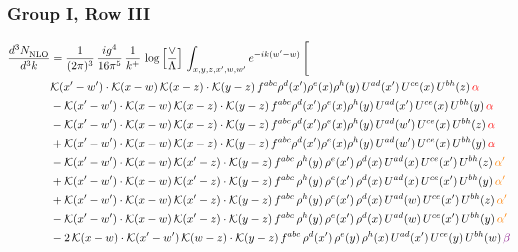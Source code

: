 \documentclass[9pt]{article}
\numberwithin{equation}{section}
\begin{document}
\subsubsection{Group I, Row III}
\begin{align}
    \frac{d^{3}N_{\rm NLO}^{\rm}}{d^{3}k}  & = \frac{1}{(2\pi)^{3}}\, \frac{ig^{4}}{16\pi^{5}}\, \frac{1}{k^{+}}\, \log{\left[\frac{\vee}{\Lambda}\right]}\, \int_{x,y,z,x^{\prime},w,w^{\prime}}e^{-ik(w^{\prime}-w)}\, \Bigg[\notag \\ & \mathcal{K}(x'-w')\cdot \mathcal{K}(x-w)\, \mathcal{K}(x-z)\cdot \mathcal{K}(y-z)\, f^{abc}\rho^{d}(x')\rho^{e}(x)\rho^{h}(y)\, U^{ad}(x')\,U^{ce}(x)\, U^{bh}(z)\,{\color{red} \alpha}\notag\\ & - \mathcal{K}(x'-w')\cdot \mathcal{K}(x-w)\, \mathcal{K}(x-z)\cdot \mathcal{K}(y-z)\, f^{abc}\rho^{d}(x')\rho^{e}(x)\rho^{h}(y)\, U^{ad}(x')\,U^{ce}(x)\, U^{bh}(y)\,{\color{red} \alpha}\notag \\ &-\mathcal{K}(x'-w')\cdot \mathcal{K}(x-w)\, \mathcal{K}(x-z)\cdot \mathcal{K}(y-z)\, f^{abc}\rho^{d}(x')\rho^{e}(x)\rho^{h}(y)\, U^{ad}(w')\,U^{ce}(x)\, U^{bh}(z)\,{\color{red} \alpha}\notag \\ & +\mathcal{K}(x'-w')\cdot \mathcal{K}(x-w)\, \mathcal{K}(x-z)\cdot \mathcal{K}(y-z)\, f^{abc}\rho^{d}(x')\rho^{e}(x)\rho^{h}(y)\, U^{ad}(w')\,U^{ce}(x)\, U^{bh}(y)\,{\color{red} \alpha}\notag \\ & -\mathcal{K}(x'-w')\cdot\mathcal{K}(x-w)\,\mathcal{K}(x'-z)\cdot\mathcal{K}(y-z)\, f^{abc}\,\rho^{h}(y)\,\rho^{e}(x')\,\rho^{d}(x)\,U^{ad}(x)\,U^{ce}(x')\,U^{bh}(z)\,{\color{orange} \alpha'}\notag \\ &+\mathcal{K}(x'-w')\cdot\mathcal{K}(x-w)\,\mathcal{K}(x'-z)\cdot\mathcal{K}(y-z)\, f^{abc}\,\rho^{h}(y)\,\rho^{e}(x')\,\rho^{d}(x)\,U^{ad}(x)\,U^{ce}(x')\,U^{bh}(y)\,{\color{orange} \alpha'}\notag \\ & +\mathcal{K}(x'-w')\cdot\mathcal{K}(x-w)\,\mathcal{K}(x'-z)\cdot\mathcal{K}(y-z)\, f^{abc}\,\rho^{h}(y)\,\rho^{e}(x')\,\rho^{d}(x)\,U^{ad}(w)\,U^{ce}(x')\,U^{bh}(z)\,{\color{orange} \alpha'}\notag \\ & -\mathcal{K}(x'-w')\cdot\mathcal{K}(x-w)\,\mathcal{K}(x'-z)\cdot\mathcal{K}(y-z)\, f^{abc}\,\rho^{h}(y)\,\rho^{e}(x')\,\rho^{d}(x)\,U^{ad}(w)\,U^{ce}(x')\,U^{bh}(y)\,{\color{orange} \alpha'}\notag \\ & -2\,\mathcal{K}(x-w)\cdot\mathcal{K}(x'-w')\,\mathcal{K}(w-z)\cdot\mathcal{K}(y-z)\, f^{abc}\,\rho^{d}(x')\,\rho^{e}(y)\,\rho^{h}(x)\,U^{ad}(x')\,U^{ce}(y)\,U^{bh}(w)\,{\color{violet} \beta}\notag\\

\end{align}
\end{document}
